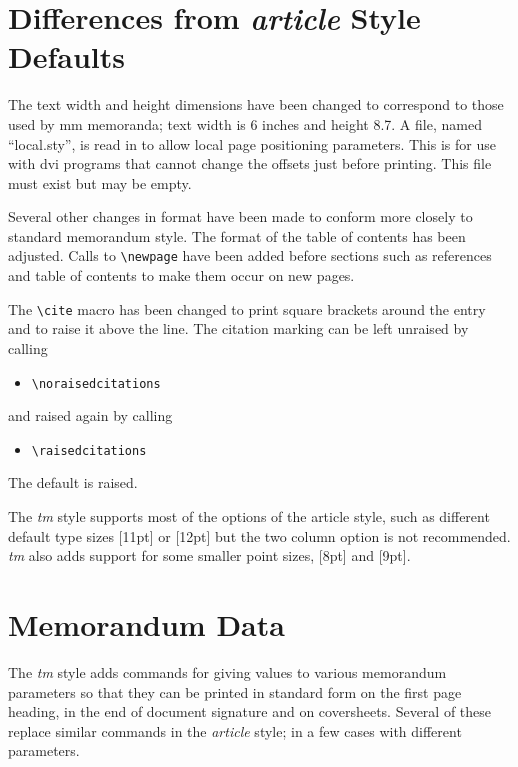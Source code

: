 \section{Differences from {\it article} Style Defaults}
The text width and height dimensions have been changed to correspond
to those used by mm memoranda; text width is 6 inches and height
8.7.  A file, named ``local.sty'', is read in to allow local page
positioning parameters.  This is for use with dvi programs that cannot
change the offsets just before printing.  This file must exist but
may be empty.

Several other changes in format have been made to conform more
closely to standard memorandum style.  The format of the table of
contents has been adjusted.  Calls to \verb|\newpage| have been
added before sections such as references and table of contents to
make them occur on new pages.

The \verb|\cite| macro has been changed to print square brackets
around the entry and to raise it above the
line.  The citation marking can be left unraised by
calling 
\begin{itemize}
\item[]
\verb|\noraisedcitations|
\end{itemize}
and raised again by calling
\begin{itemize}
\item[]
\verb|\raisedcitations|
\end{itemize}
The default is raised.

The {\it tm} style supports most of the options of the article style,
such as different default type sizes [11pt] or [12pt] but the two
column option is not recommended.  {\it tm} also adds support for some
smaller point sizes, [8pt] and [9pt].
\section{Memorandum Data}
The {\it tm} style adds commands for giving values to various
memorandum parameters so that they can be printed in standard form
on the first page heading, in the end of document signature and on
coversheets.
Several of these replace similar commands in the {\it article}
style; in a few cases with different parameters.  

